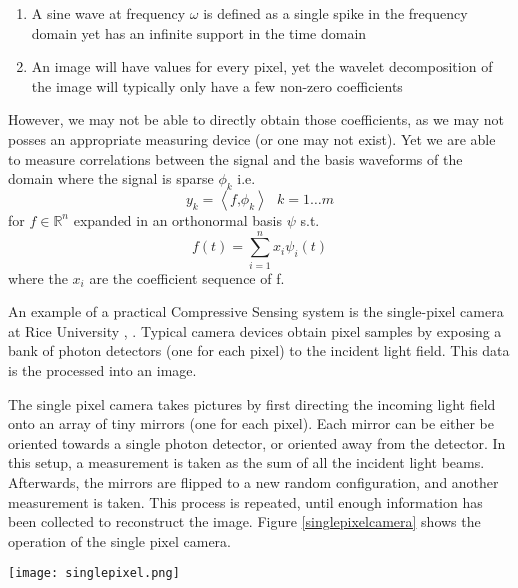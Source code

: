 \begin{enumerate}
\item  A sine wave at frequency \(\omega\) is defined as a single spike in the frequency domain yet has an infinite support in the time domain
\item An image will have values for every pixel, yet the wavelet decomposition of the image will typically only have a few non-zero coefficients
\end{enumerate} 

However, we may not be able to directly obtain those coefficients, as we may not posses an appropriate measuring device (or one may not exist). Yet we are able to measure correlations between the signal and the basis waveforms of the domain where the signal is sparse \(\phi_{k}\) i.e. 
%
\begin{equation}
y_{k} = \left\langle f \text{,} \phi_{k} \right\rangle \text{ } k = 1 \ldots m
\end{equation}
%
for \( f \in \mathbb{R}^n \) expanded in an orthonormal basis \( \psi \) s.t.
%
\begin{equation}
f(t) = \sum_{i = 1}^n x_{i}\psi_{i}(t) 
\end{equation}
%
where the \(x_{i} \) are the coefficient sequence of f. 

An example of a practical Compressive Sensing system is the single-pixel camera at Rice University \cite{Duarte2008}, \cite{wakin2006architecture}. Typical camera devices obtain pixel samples by exposing a bank of photon detectors (one for each pixel) to the incident light field. This data is the processed into an image.

The single pixel camera takes pictures by first directing the incoming light field onto an array of tiny mirrors (one for each pixel). Each mirror can be either be oriented towards a single photon detector, or oriented away from the detector. In this setup, a measurement is taken as the sum of all the incident light beams. Afterwards, the mirrors are flipped to a new random configuration, and another measurement is taken. This process is repeated, until enough information has been collected to reconstruct the image. Figure \ref{singlepixelcamera} shows the operation of the single pixel camera.

\begin{figure*}[h]
\centering
\texttt{[image: singlepixel.png]}
\caption{The operation of the single pixel camera at Rice University \cite{Thompson2011}, \cite{DavenportSinglePixel}}
\label{singlepixelcamera}
\end{figure*}

